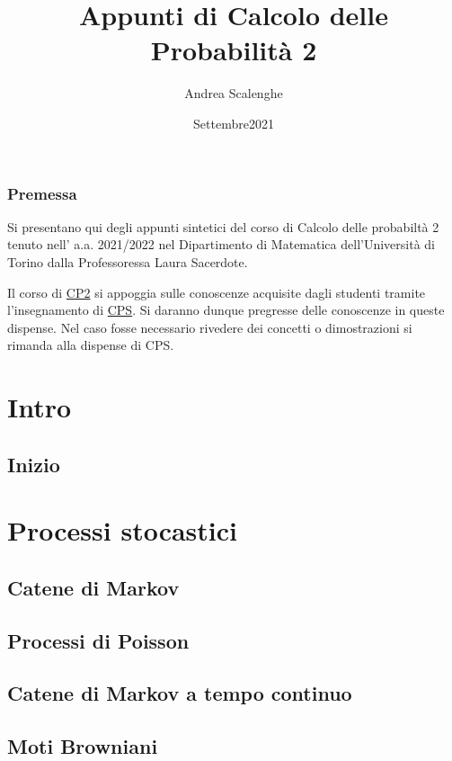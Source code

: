 \documentclass{book}
\theoremstyle{remark}
\theoremstyle{proposition}
\theoremstyle{definition}
\begin{document}
\title{Appunti di Calcolo delle Probabilità 2}
\author{Andrea Scalenghe}
\date{Settembre2021}
\begin{titlepage}
\maketitle
\end{titlepage}
\setcounter{tocdepth}{2} %
\setcounter{secnumdepth}{3} %
\manualmark
\markboth{\spacedlowsmallcaps{\contentsname}}{\spacedlowsmallcaps{\contentsname}}
\tableofcontents
{}
\renewcommand{\chaptermark}[1]{\markboth{\spacedlowsmallcaps{#1}}{\spacedlowsmallcaps{#1}}}
\renewcommand{\sectionmark}[1]{\markright{\thesection\enspace\spacedlowsmallcaps{#1}}}
\newpage
\section{Premessa}
Si presentano qui degli appunti sintetici del corso di Calcolo delle probabiltà 2 tenuto nell' a.a. 2021/2022 nel Dipartimento di Matematica dell'Università di Torino dalla Professoressa Laura Sacerdote.

Il corso di \href{https://www.matematica.unito.it/do/corsi.pl/Show?_id=z1b7}{CP2} si appoggia sulle conoscenze acquisite dagli studenti tramite l'insegnamento di \href{https://www.matematica.unito.it/do/corsi.pl/Show?_id=hffu}{CPS}. Si daranno dunque pregresse delle conoscenze in queste dispense. Nel caso fosse necessario rivedere dei concetti o dimostrazioni si rimanda alla dispense di CPS.
\part{Intro}
\chapter{Inizio}

\part{Processi stocastici}
\chapter{Catene di Markov}

\chapter{Processi di Poisson}

\chapter{Catene di Markov a tempo continuo}

\chapter{Moti Browniani}

\end{document}
